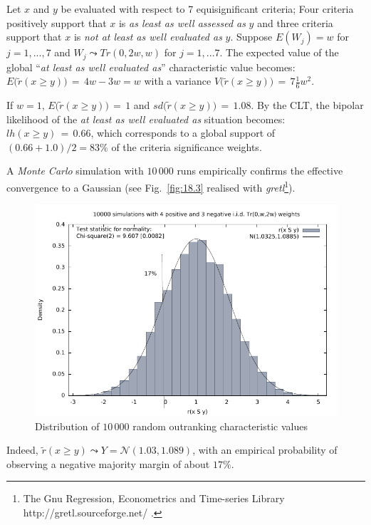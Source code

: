 \begin{example} Let $x$ and $y$ be evaluated with respect to 7 equisignificant criteria; Four criteria positively support that $x$ is \emph{as least as  well assessed as} $y$ and three criteria support that $x$ is \emph{not at least as well evaluated as} $y$. Suppose $E(W_j) = w$ for $j = 1,...,7$ and $W_j \leadsto Tr(0, 2w, w)$ for $j = 1,...7$. The expected value of the global ``\emph{at least as well evaluated as}'' characteristic value becomes: $E\big(\tilde{r}(x \geqslant y)\big)\, = \, 4w - 3w = w$ with a variance $V\big(\tilde{r}(x \geqslant y)\big)\,=\, 7\frac{1}{6}w^2$. 

If $w = 1$, $E\big(\tilde{r}(x \geqslant y)\big)\, = \, 1$ and $sd\big(\tilde{r}(x \geqslant y)\big)\,=\, 1.08$. By the CLT, the bipolar likelihood of the \emph{at least as well evaluated as} situation becomes: $lh(x \geqslant y)\,=\, 0.66$, which corresponds to a global support of $(0.66 + 1.0)/2 = 83\%$ of the criteria significance weights.

A \emph{Monte Carlo} simulation with $10\,000$ runs empirically confirms the effective convergence to a Gaussian (see Fig.~\vref{fig:18.3} realised with \emph{gretl}\footnote{The Gnu Regression, Econometrics and Time-series Library http://gretl.sourceforge.net/ .}).
\begin{figure}[ht]
\includegraphics[width=\hsize]{Figures/18-3-simulLikelihood.pdf}
\caption{Distribution of $10\,000$ random outranking characteristic values}
\label{fig:18.3}       %
\end{figure}

Indeed, $\tilde{r}(x \geqslant y) \leadsto Y = \mathcal{N}(1.03,1.089)$, with an empirical probability of observing a negative majority margin of about $17\%$.
\end{example}

